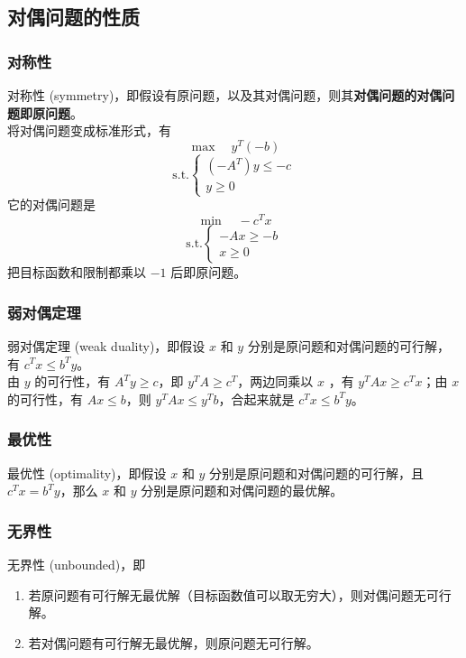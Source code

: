 \subsection{对偶问题的性质}
\subsubsection{对称性}
对称性 (symmetry)，即假设有原问题，以及其对偶问题，则其\textbf{对偶问题的对偶问题即原问题}。 \\
将对偶问题变成标准形式，有
$$
\max \quad y^T(-b)
$$
$$
\text{s.t.} 
\begin{cases}
    (-A^T)y \le -c \\
    y \ge 0
\end{cases}
$$
它的对偶问题是
$$
\min \quad -c^Tx
$$
$$
\text{s.t.} 
\begin{cases}
    -Ax \ge -b \\
    x \ge 0
\end{cases}
$$
把目标函数和限制都乘以 $-1$ 后即原问题。

\subsubsection{弱对偶定理}
弱对偶定理 (weak duality)，即假设 $x$ 和 $y$ 分别是原问题和对偶问题的可行解，有 \textbf{$c^Tx \le b^Ty$}。 \\
由 $y$ 的可行性，有 $A^Ty \ge c$，即 $y^TA \ge c^T$，两边同乘以 $x$ ，有 $y^TAx \ge c^Tx$；由 $x$ 的可行性，有 $Ax \le b$，则 $y^TAx \le y^Tb$，合起来就是 $c^Tx \le b^Ty$。

\subsubsection{最优性}
最优性 (optimality)，即假设 $x$ 和 $y$ 分别是原问题和对偶问题的可行解，且 $c^Tx = b^Ty$，那么 $x$ 和 $y$ 分别是原问题和对偶问题的最优解。

\subsubsection{无界性}
无界性 (unbounded)，即
\begin{enumerate}
    \item 若原问题有可行解无最优解（目标函数值可以取无穷大），则对偶问题无可行解。
    \item 若对偶问题有可行解无最优解，则原问题无可行解。
\end{enumerate}

